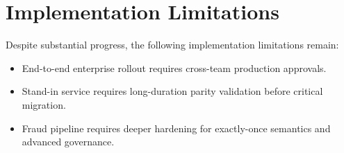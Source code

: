 \section{Implementation Limitations}

Despite substantial progress, the following implementation limitations remain:

\begin{itemize}
	\item End-to-end enterprise rollout requires cross-team production approvals.
	\item Stand-in service requires long-duration parity validation before critical migration.
	\item Fraud pipeline requires deeper hardening for exactly-once semantics and advanced governance.
\end{itemize}